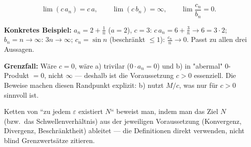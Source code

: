 \begin{ergebnis}
\begin{equation*}
  \lim(c\,a_n)=c\,a,\qquad
  \lim(c\,b_n)=\infty,\qquad
  \lim\frac{c_n}{b_n}=0 .
\end{equation*}
\end{ergebnis}

\begin{kontrolle}
\textbf{Konkretes Beispiel:} $a_n=2+\tfrac1n$ ($a=2$), $c=3$:
$c\,a_n=6+\tfrac3n\to6=3\cdot2$; $b_n=n\to\infty$: $3n\to\infty$;
$c_n=\sin n$ (beschr\"ankt $\le1$): $\tfrac{c_n}{n}\to0$. Passt zu allen
drei Aussagen.

\textbf{Grenzfall:} W\"are $c=0$, w\"are a) trivilar ($0\cdot a_n=0$) und
b) in "abermal" $0$-Produkt $=0$, nicht $\infty$ --- deshalb ist die
Voraussetzung $c>0$ essenziell. Die Beweise machen diesen Randpunkt
explizit: b) nutzt $M/c$, was nur f\"ur $c>0$ sinnvoll ist.
\end{kontrolle}

\begin{merksatz}
Ketten von ``zu jedem $\varepsilon$ existiert $N$`` beweist man, indem man
das Ziel $N$ (bzw.\ das Schwellenverh\"altnis) aus der jeweiligen
Voraussetzung (Konvergenz, Divergenz, Beschr\"anktheit) ableitet ---
die Definitionen direkt verwenden, nicht blind Grenzwerts\"atze zitieren.
\end{merksatz}
